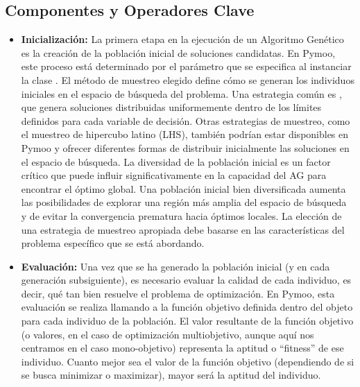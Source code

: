 \subsection{Componentes y Operadores Clave}
\begin{itemize}[label=\textbullet, leftmargin=*]
    \item \textbf{Inicialización:} La primera etapa en la ejecución de un Algoritmo Genético es la creación de la población inicial de soluciones candidatas. En Pymoo, este proceso está determinado por el parámetro \texttt{} que se especifica al instanciar la clase \texttt{}. El método de muestreo elegido define cómo se generan los individuos iniciales en el espacio de búsqueda del problema. Una estrategia común es \texttt{}, que genera soluciones distribuidas uniformemente dentro de los límites definidos para cada variable de decisión. Otras estrategias de muestreo, como el muestreo de hipercubo latino (LHS), también podrían estar disponibles en Pymoo y ofrecer diferentes formas de distribuir inicialmente las soluciones en el espacio de búsqueda. La diversidad de la población inicial es un factor crítico que puede influir significativamente en la capacidad del AG para encontrar el óptimo global. Una población inicial bien diversificada aumenta las posibilidades de explorar una región más amplia del espacio de búsqueda y de evitar la convergencia prematura hacia óptimos locales. La elección de una estrategia de muestreo apropiada debe basarse en las características del problema específico que se está abordando.

    \item \textbf{Evaluación:} Una vez que se ha generado la población inicial (y en cada generación subsiguiente), es necesario evaluar la calidad de cada individuo, es decir, qué tan bien resuelve el problema de optimización. En Pymoo, esta evaluación se realiza llamando a la función objetivo definida dentro del objeto \texttt{} para cada individuo de la población. El valor resultante de la función objetivo (o valores, en el caso de optimización multiobjetivo, aunque aquí nos centramos en el caso mono-objetivo) representa la aptitud o ``fitness'' de ese individuo. Cuanto mejor sea el valor de la función objetivo (dependiendo de si se busca minimizar o maximizar), mayor será la aptitud del individuo.


\end{itemize}
